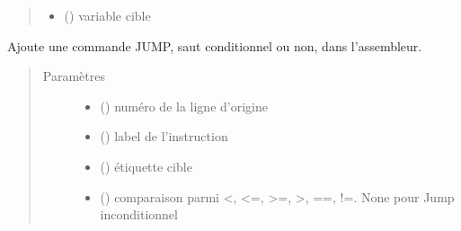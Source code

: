 \documentclass[letterpaper,10pt,french]{sphinxmanual}
\begin{document}
\begin{fulllineitems}
\begin{fulllineitems}
\begin{quote}
\begin{description}
\begin{itemize}
\item {} 
 ({\hyperref[\detokenize{variable:variable.Variable}]{}}) \textendash{} variable cible

\end{itemize}

\end{description}\end{quote}

\end{fulllineitems}


\begin{fulllineitems}
\label{\detokenize{assembleurcontainer:assembleurcontainer.AssembleurContainer.pushJump}}
Ajoute une commande JUMP, saut conditionnel ou non, dans l’assembleur.
\begin{quote}\begin{description}
\item[{Paramètres}] \leavevmode\begin{itemize}
\item {} 
 () \textendash{} numéro de la ligne d’origine

\item {} 
 (\sphinxstyleliteralemphasis{\sphinxupquote{{[}}}{\hyperref[\detokenize{label:label.Label}]{\sphinxcrossref{\sphinxstyleliteralemphasis{\sphinxupquote{Label}}}}}\sphinxstyleliteralemphasis{\sphinxupquote{{]}}}) \textendash{} label de l’instruction

\item {} 
 ({\hyperref[\detokenize{label:label.Label}]{}}) \textendash{} étiquette cible

\item {} 
 () \textendash{} comparaison parmi \textless{}, \textless{}=, \textgreater{}=, \textgreater{}, ==, !=. None pour Jump inconditionnel


\end{itemize}
\end{description}
\end{quote}
\end{fulllineitems}
\end{fulllineitems}
\end{document}
